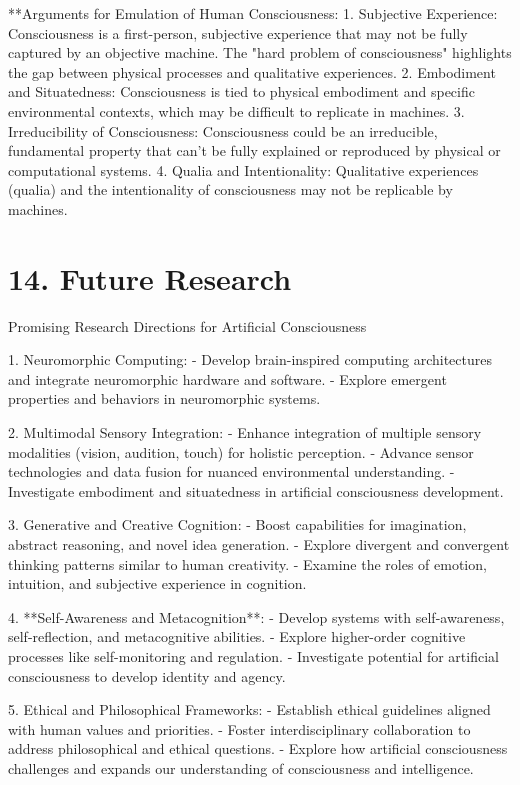 \documentclass{article}
\begin{document}
**Arguments for Emulation of Human Consciousness:
1. Subjective Experience: Consciousness is a first-person, subjective experience that may not be fully captured by an objective machine. The "hard problem of consciousness" highlights the gap between physical processes and qualitative experiences.
2. Embodiment and Situatedness: Consciousness is tied to physical embodiment and specific environmental contexts, which may be difficult to replicate in machines.
3. Irreducibility of Consciousness: Consciousness could be an irreducible, fundamental property that can't be fully explained or reproduced by physical or computational systems.
4. Qualia and Intentionality: Qualitative experiences (qualia) and the intentionality of consciousness may not be replicable by machines.


\section*{14. Future Research}
Promising Research Directions for Artificial Consciousness

1. Neuromorphic Computing:
   - Develop brain-inspired computing architectures and integrate neuromorphic hardware and software.
   - Explore emergent properties and behaviors in neuromorphic systems.

2. Multimodal Sensory Integration:
   - Enhance integration of multiple sensory modalities (vision, audition, touch) for holistic perception.
   - Advance sensor technologies and data fusion for nuanced environmental understanding.
   - Investigate embodiment and situatedness in artificial consciousness development.

3. Generative and Creative Cognition:
   - Boost capabilities for imagination, abstract reasoning, and novel idea generation.
   - Explore divergent and convergent thinking patterns similar to human creativity.
   - Examine the roles of emotion, intuition, and subjective experience in cognition.

4. **Self-Awareness and Metacognition**:
   - Develop systems with self-awareness, self-reflection, and metacognitive abilities.
   - Explore higher-order cognitive processes like self-monitoring and regulation.
   - Investigate potential for artificial consciousness to develop identity and agency.

5. Ethical and Philosophical Frameworks:
   - Establish ethical guidelines aligned with human values and priorities.
   - Foster interdisciplinary collaboration to address philosophical and ethical questions.
   - Explore how artificial consciousness challenges and expands our understanding of consciousness and intelligence.
\end{document}
